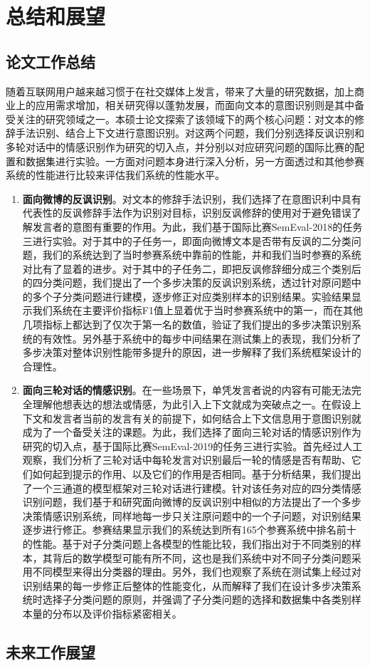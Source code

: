 \chapter{总结和展望}
\label{cha:conclusion}

\section{论文工作总结}

随着互联网用户越来越习惯于在社交媒体上发言，带来了大量的研究数据，加上商业上的应用需求增加，相关研究得以蓬勃发展，而面向文本的意图识别则是其中备受关注的研究领域之一。本硕士论文探索了该领域下的两个核心问题：对文本的修辞手法识别、结合上下文进行意图识别。对这两个问题，我们分别选择反讽识别和多轮对话中的情感识别作为研究的切入点，并分别以对应研究问题的国际比赛的配置和数据集进行实验。一方面对问题本身进行深入分析，另一方面透过和其他参赛系统的性能进行比较来评估我们系统的性能水平。

\begin{enumerate}

\item {\bf 面向微博的反讽识别}。对文本的修辞手法识别，我们选择了在意图识利中具有代表性的反讽修辞手法作为识别对目标，识别反讽修辞的使用对于避免错误了解发言者的意图有重要的作用。为此，我们基于国际比赛SemEval-2018的任务三进行实验。对于其中的子任务一，即面向微博文本是否带有反讽的二分类问题，我们的系统达到了当时参赛系统中靠前的性能，并和我们当时参赛的系统对比有了显着的进步。对于其中的子任务二，即把反讽修辞细分成三个类别后的四分类问题，我们提出了一个多步决策的反讽识别系统，透过针对原问题中的多个子分类问题进行建模，逐步修正对应类别样本的识别结果。实验结果显示我们系统在主要评价指标F1值上显着优于当时参赛系统中的第一，而在其他几项指标上都达到了仅次于第一名的数值，验证了我们提出的多步决策识别系统的有效性。另外基于系统中的每步中间结果在测试集上的表现，我们分析了多步决策对整体识别性能带多提升的原因，进一步解释了我们系统框架设计的合理性。

\item {\bf 面向三轮对话的情感识别}。在一些场景下，单凭发言者说的内容有可能无法完全理解他想表达的想法或情感，为此引入上下文就成为突破点之一。在假设上下文和发言者当前的发言有关的前提下，如何结合上下文信息用于意图识别就成为了一个备受关注的课题。为此，我们选择了面向三轮对话的情感识别作为研究的切入点，基于国际比赛SemEval-2019的任务三进行实验。首先经过人工观察，我们分析了三轮对话中每轮发言对识别最后一轮的情感是否有帮助、它们如何起到提示的作用、以及它们的作用是否相同。基于分析结果，我们提出了一个三通道的模型框架对三轮对话进行建模。针对该任务对应的四分类情感识别问题，我们基于和研究面向微博的反讽识别中相似的方法提出了一个多步决策情感识别系统，同样地每一步只关注原问题中的一个子问题，对识别结果逐步进行修正。参赛结果显示我们的系统达到所有165个参赛系统中排名前十的性能。基于对子分类问题上各模型的性能比较，我们指出对于不同类别的样本，其背后的数学模型可能有所不同，这也是我们系统中对不同子分类问题采用不同模型来得出分类器的理由。另外，我们也观察了系统在测试集上经过对识别结果的每一步修正后整体的性能变化，从而解释了我们在设计多步决策系统时选择子分类问题的原则，并强调了子分类问题的选择和数据集中各类别样本量的分布以及评价指标紧密相关。

\end{enumerate}

\section{未来工作展望}






